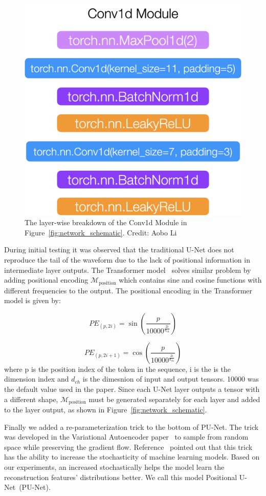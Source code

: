 \begin{figure}[htb!]
    \centering
    \includegraphics[width=0.3\linewidth,trim={0pc 0pc 0pc 0pc},clip]{ch6/figs/conv1d.png}
    \caption{The layer-wise breakdown of the Conv1d Module in Figure~\ref{fig:network_schematic}.  Credit: Aobo Li}
    \label{ch6:fig:cov1d_break_down}
\end{figure}

During initial testing it was observed that the traditional U-Net does not reproduce the tail of the waveform due to the lack of positional information in intermediate layer outputs. The Transformer model~\cite{Transformer} solves similar problem by adding positional encoding $\mathcal{M}_{\mathrm{position}}$ which contains sine and cosine functions with different frequencies to the output. The positional encoding in the Transformer model is given by:

\begin{equation}
PE_{(p, 2i)} = \sin\left(\frac{p}{10000^{\frac{2i}{d_{\text{ch}}}}}\right)
\label{eqn:positional_encoding_sin}
\end{equation}

\begin{equation}
PE_{(p, 2i+1)} = \cos\left(\frac{p}{10000^{\frac{2i}{d_{\text{ch}}}}}\right)
\label{eqn:positional_encoding_cos}
\end{equation}
where p is the position index of the token in the sequence, i is the is the dimension index and $d_{ch}$ is the dimesnion of input and output tensors. 10000 was the default value used in the paper. Since each U-Net layer outputs a tensor with a different shape, $\mathcal{M}_{\mathrm{position}}$ must be generated separately for each layer and added to the layer output, as shown in Figure~\ref{fig:network_schematic}.

Finally we added a re-parameterization trick to the bottom of PU-Net. The trick was developed in the Variational Autoencoder paper~\cite{VAE} to sample from random space while preserving the gradient flow. Reference~\cite{AAE} pointed out that this trick has the ability to increase the stochasticity of machine learning models. Based on our experiments, an increased stochastically helps the model learn the reconstruction features' distributions better. We call this model Positional U-Net~(PU-Net).

